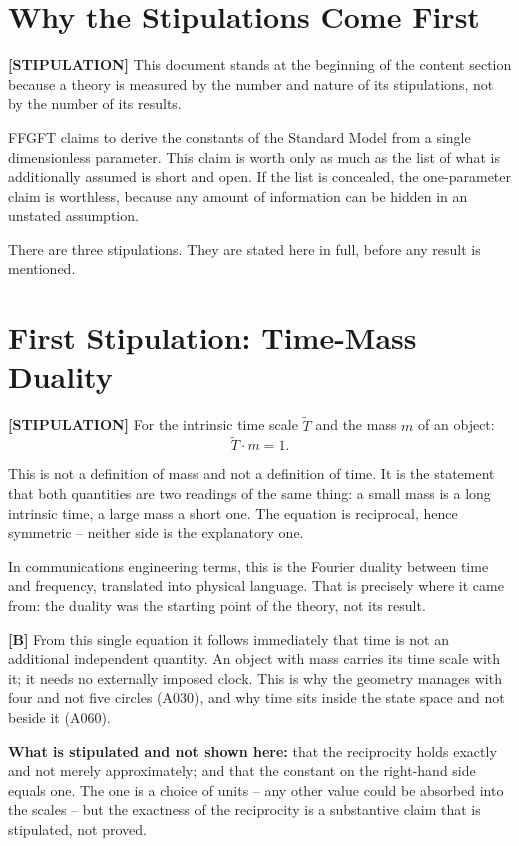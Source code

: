 \section{Why the Stipulations Come First}

\textbf{[STIPULATION]} This document stands at the beginning of the content
section because a theory is measured by the number and nature of its
stipulations, not by the number of its results.

FFGFT claims to derive the constants of the Standard Model from a single
dimensionless parameter. This claim is worth only as much as the list of
what is additionally assumed is short and open. If the list is concealed,
the one-parameter claim is worthless, because any amount of information
can be hidden in an unstated assumption.

There are three stipulations. They are stated here in full, before any
result is mentioned.

\section{First Stipulation: Time-Mass Duality}

\textbf{[STIPULATION]} For the intrinsic time scale $\tilde T$ and the
mass $m$ of an object:
\[
  \tilde T \cdot m = 1 .
\]

This is not a definition of mass and not a definition of time. It is the
statement that both quantities are two readings of the same thing: a small
mass is a long intrinsic time, a large mass a short one. The equation is
reciprocal, hence symmetric -- neither side is the explanatory one.

In communications engineering terms, this is the Fourier duality between
time and frequency, translated into physical language. That is precisely
where it came from: the duality was the starting point of the theory,
not its result.

\textbf{[B]} From this single equation it follows immediately that time is
not an additional independent quantity. An object with mass carries its
time scale with it; it needs no externally imposed clock. This is why the
geometry manages with four and not five circles (A030), and why time sits
inside the state space and not beside it (A060).

\textbf{What is stipulated and not shown here:} that the reciprocity holds
exactly and not merely approximately; and that the constant on the right-hand
side equals one. The one is a choice of units -- any other value could be
absorbed into the scales -- but the exactness of the reciprocity is a
substantive claim that is stipulated, not proved.

